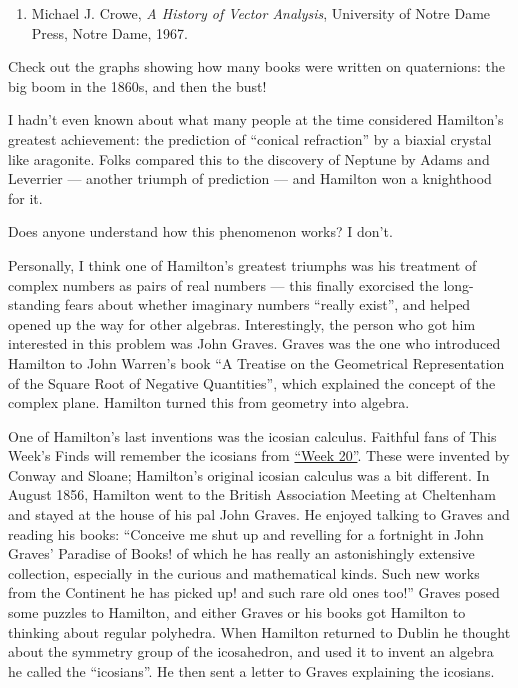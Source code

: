 \documentclass{article}
\def\tightlist{}
\begin{document}
\begin{enumerate}
\def\labelenumi{\arabic{enumi})}
\tightlist
\item
  Michael J. Crowe, \emph{A History of Vector Analysis}, University of
  Notre Dame Press, Notre Dame, 1967.
\end{enumerate}

Check out the graphs showing how many books were written on quaternions:
the big boom in the 1860s, and then the bust!

I hadn't even known about what many people at the time considered
Hamilton's greatest achievement: the prediction of ``conical
refraction'' by a biaxial crystal like aragonite. Folks compared this to
the discovery of Neptune by Adams and Leverrier --- another triumph of
prediction --- and Hamilton won a knighthood for it.

Does anyone understand how this phenomenon works? I don't.

Personally, I think one of Hamilton's greatest triumphs was his
treatment of complex numbers as pairs of real numbers --- this finally
exorcised the long-standing fears about whether imaginary numbers
``really exist'', and helped opened up the way for other algebras.
Interestingly, the person who got him interested in this problem was
John Graves. Graves was the one who introduced Hamilton to John Warren's
book ``A Treatise on the Geometrical Representation of the Square Root
of Negative Quantities'', which explained the concept of the complex
plane. Hamilton turned this from geometry into algebra.

One of Hamilton's last inventions was the icosian calculus. Faithful
fans of This Week's Finds will remember the icosians from
\protect\hyperlink{week20}{``Week 20''}. These were invented by Conway
and Sloane; Hamilton's original icosian calculus was a bit different. In
August 1856, Hamilton went to the British Association Meeting at
Cheltenham and stayed at the house of his pal John Graves. He enjoyed
talking to Graves and reading his books: ``Conceive me shut up and
revelling for a fortnight in John Graves' Paradise of Books! of which he
has really an astonishingly extensive collection, especially in the
curious and mathematical kinds. Such new works from the Continent he has
picked up! and such rare old ones too!'' Graves posed some puzzles to
Hamilton, and either Graves or his books got Hamilton to thinking about
regular polyhedra. When Hamilton returned to Dublin he thought about the
symmetry group of the icosahedron, and used it to invent an algebra he
called the ``icosians''. He then sent a letter to Graves explaining the
icosians.
\end{document}
